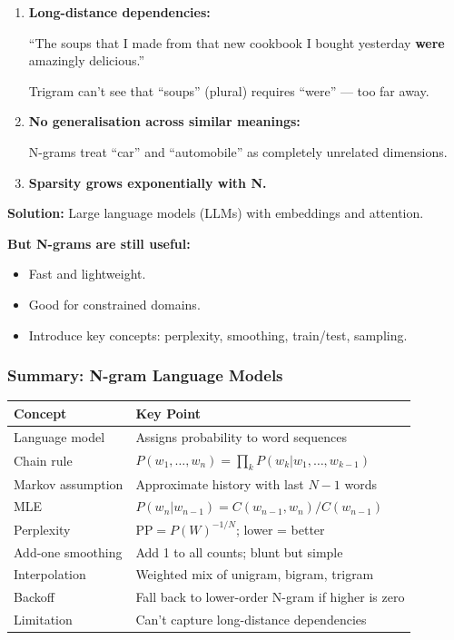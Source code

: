 \begin{tipbox}
\begin{enumerate}
  \item \textbf{Long-distance dependencies:}
  
  ``The soups that I made from that new cookbook I bought yesterday \textbf{were} amazingly delicious.''
  
  Trigram can't see that ``soups'' (plural) requires ``were'' --- too far away.
  
  \item \textbf{No generalisation across similar meanings:}
  
  N-grams treat ``car'' and ``automobile'' as completely unrelated dimensions.
  
  \item \textbf{Sparsity grows exponentially with N.}
\end{enumerate}

\textbf{Solution:} Large language models (LLMs) with embeddings and attention.
\end{tipbox}

\textbf{But N-grams are still useful:}
\begin{itemize}
  \item Fast and lightweight.
  \item Good for constrained domains.
  \item Introduce key concepts: perplexity, smoothing, train/test, sampling.
\end{itemize}

\bigseparator

\subsubsection{Summary: N-gram Language Models}

\begin{center}
\renewcommand{\arraystretch}{1.3}
\begin{tabular}{@{} l p{10cm} @{}}
\toprule
\textbf{Concept} & \textbf{Key Point} \\
\midrule
Language model & Assigns probability to word sequences \\
Chain rule & $P(w_1, \ldots, w_n) = \prod_k P(w_k | w_1, \ldots, w_{k-1})$ \\
Markov assumption & Approximate history with last $N-1$ words \\
MLE & $P(w_n | w_{n-1}) = C(w_{n-1}, w_n) / C(w_{n-1})$ \\
Perplexity & $\text{PP} = P(W)^{-1/N}$; lower = better \\
Add-one smoothing & Add 1 to all counts; blunt but simple \\
Interpolation & Weighted mix of unigram, bigram, trigram \\
Backoff & Fall back to lower-order N-gram if higher is zero \\
Limitation & Can't capture long-distance dependencies \\
\bottomrule
\end{tabular}
\end{center}


